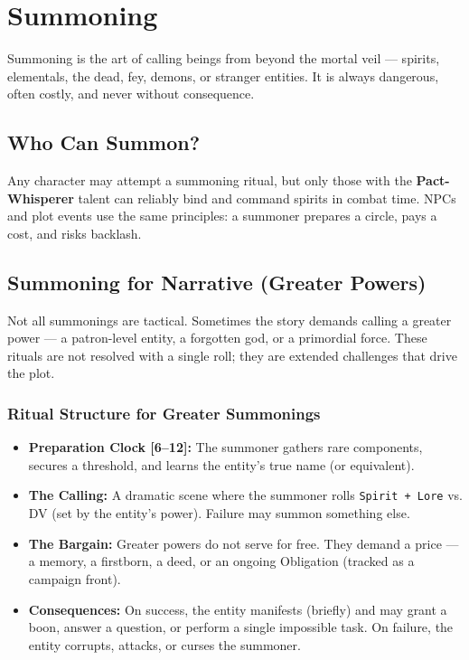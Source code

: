 
\section{Summoning}

Summoning is the art of calling beings from beyond the mortal veil — spirits, elementals, the dead, fey, demons, or stranger entities. It is always dangerous, often costly, and never without consequence.

\subsection{Who Can Summon?}

Any character may attempt a summoning ritual, but only those with the \textbf{Pact-Whisperer} talent can reliably bind and command spirits in combat time. NPCs and plot events use the same principles: a summoner prepares a circle, pays a cost, and risks backlash.

\subsection{Summoning for Narrative (Greater Powers)}

Not all summonings are tactical. Sometimes the story demands calling a greater power — a patron-level entity, a forgotten god, or a primordial force. These rituals are not resolved with a single roll; they are extended challenges that drive the plot.

\subsubsection{Ritual Structure for Greater Summonings}

\begin{itemize}
  \item \textbf{Preparation Clock [6–12]:} The summoner gathers rare components, secures a threshold, and learns the entity's true name (or equivalent).
  \item \textbf{The Calling:} A dramatic scene where the summoner rolls \texttt{Spirit + Lore} vs. DV (set by the entity's power). Failure may summon something else.
  \item \textbf{The Bargain:} Greater powers do not serve for free. They demand a price — a memory, a firstborn, a deed, or an ongoing Obligation (tracked as a campaign front).
  \item \textbf{Consequences:} On success, the entity manifests (briefly) and may grant a boon, answer a question, or perform a single impossible task. On failure, the entity corrupts, attacks, or curses the summoner.
\end{itemize}

